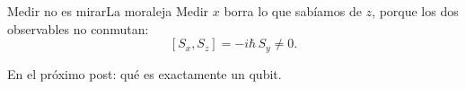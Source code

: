 \documentclass[12pt]{beamer}
\begin{document}
\begin{frame}{Medir no es mirar}{La moraleja}
Medir $x$ borra lo que sabíamos de $z$, porque los dos observables no
conmutan:
\[
  [S_x, S_z] = -i\hbar\, S_y \neq 0 .
\]
\end{frame}

  {En el próximo post: qué es exactamente un qubit.}
\end{document}
